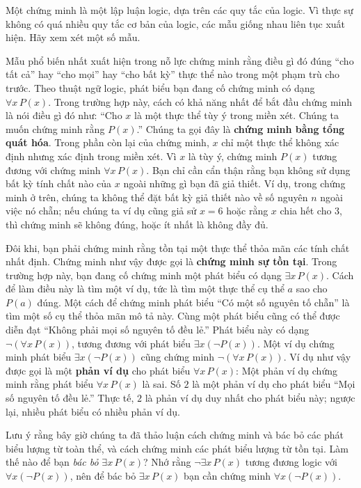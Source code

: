 Một chứng minh là một lập luận logic, dựa trên các quy tắc của logic. Vì thực sự không có quá nhiều quy tắc cơ bản của logic, các mẫu giống nhau liên tục xuất hiện. Hãy xem xét một số mẫu.

Mẫu phổ biến nhất xuất hiện trong nỗ lực chứng minh rằng điều gì đó đúng ``cho tất cả'' hay ``cho mọi'' hay ``cho bất kỳ'' thực thể nào trong một phạm trù cho trước. Theo thuật ngữ logic, phát biểu bạn đang cố chứng minh có dạng $\forall x\, P(x)$. Trong trường hợp này, cách có khả năng nhất để bắt đầu chứng minh là nói điều gì đó như: ``Cho $x$ là một thực thể tùy ý trong miền xét. Chúng ta muốn chứng minh rằng $P(x)$.'' Chúng ta gọi đây là \textbf{chứng minh bằng tổng quát hóa}. Trong phần còn lại của chứng minh, $x$ chỉ một thực thể không xác định nhưng xác định trong miền xét. Vì $x$ là tùy ý, chứng minh $P(x)$ tương đương với chứng minh $\forall x\, P(x)$. Bạn chỉ cần cẩn thận rằng bạn không sử dụng bất kỳ tính chất nào của $x$ ngoài những gì bạn đã giả thiết. Ví dụ, trong chứng minh ở trên, chúng ta không thể đặt bất kỳ giả thiết nào về số nguyên $n$ ngoài việc nó chẵn; nếu chúng ta ví dụ cũng giả sử $x = 6$ hoặc rằng $x$ chia hết cho $3$, thì chứng minh sẽ không đúng, hoặc ít nhất là không đầy đủ.

Đôi khi, bạn phải chứng minh rằng tồn tại một thực thể thỏa mãn các tính chất nhất định. Chứng minh như vậy được gọi là \textbf{chứng minh sự tồn tại}. Trong trường hợp này, bạn đang cố chứng minh một phát biểu có dạng $\exists x\, P(x)$. Cách để làm điều này là tìm một ví dụ, tức là tìm một thực thể cụ thể $a$ sao cho $P(a)$ đúng. Một cách để chứng minh phát biểu ``Có một số nguyên tố chẵn'' là tìm một số cụ thể thỏa mãn mô tả này. Cùng một phát biểu cũng có thể được diễn đạt ``Không phải mọi số nguyên tố đều lẻ.'' Phát biểu này có dạng $\neg(\forall x\, P(x))$, tương đương với phát biểu $\exists x(\neg P(x))$. Một ví dụ chứng minh phát biểu $\exists x(\neg P(x))$ cũng chứng minh $\neg(\forall x\, P(x))$. Ví dụ như vậy được gọi là một \textbf{phản ví dụ} cho phát biểu $\forall x\, P(x)$: Một phản ví dụ chứng minh rằng phát biểu $\forall x\, P(x)$ là sai. Số $2$ là một phản ví dụ cho phát biểu ``Mọi số nguyên tố đều lẻ.'' Thực tế, $2$ là phản ví dụ duy nhất cho phát biểu này; ngược lại, nhiều phát biểu có nhiều phản ví dụ.

Lưu ý rằng bây giờ chúng ta đã thảo luận cách chứng minh và bác bỏ các phát biểu lượng từ toàn thể, và cách chứng minh các phát biểu lượng từ tồn tại. Làm thế nào để bạn \emph{bác bỏ} $\exists x\, P(x)$? Nhớ rằng $\neg \exists x\, P(x)$ tương đương logic với $\forall x(\neg P(x))$, nên để bác bỏ $\exists x\, P(x)$ bạn cần chứng minh $\forall x(\neg P(x))$.

